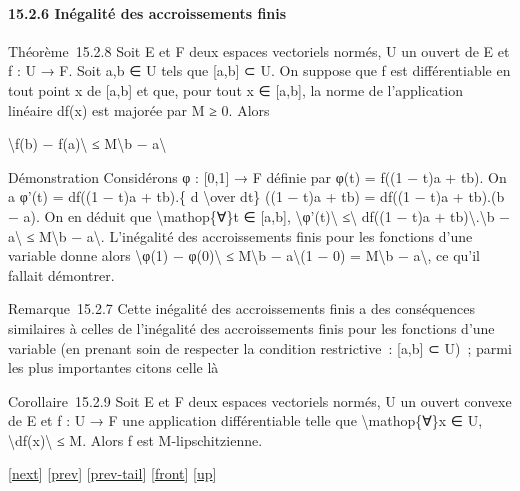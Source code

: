 \documentclass[]{article}
\begin{document}
\paragraph{15.2.6 Inégalité des accroissements finis}

Théorème~15.2.8 Soit E et F deux espaces vectoriels normés, U un ouvert
de E et f : U → F. Soit a,b ∈ U tels que {[}a,b{]} ⊂ U. On suppose que f
est différentiable en tout point x de {[}a,b{]} et que, pour tout x ∈
{[}a,b{]}, la norme de l'application linéaire df(x) est majorée par M ≥
0. Alors

\textbackslash{}\textbar{}f(b) − f(a)\textbackslash{}\textbar{} ≤
M\textbackslash{}\textbar{}b − a\textbackslash{}\textbar{}

Démonstration Considérons φ : {[}0,1{]} → F définie par φ(t) = f((1 −
t)a + tb). On a φ'(t) = df((1 − t)a + tb).\{ d \textbackslash{}over dt\}
((1 − t)a + tb) = df((1 − t)a + tb).(b − a). On en déduit que
\textbackslash{}mathop\{∀\}t ∈ {[}a,b{]},
\textbackslash{}\textbar{}φ'(t)\textbackslash{}\textbar{}
≤\textbackslash{}\textbar{} df((1 − t)a +
tb)\textbackslash{}\textbar{}.\textbackslash{}\textbar{}b −
a\textbackslash{}\textbar{} ≤ M\textbackslash{}\textbar{}b −
a\textbackslash{}\textbar{}. L'inégalité des accroissements finis pour
les fonctions d'une variable donne alors \textbackslash{}\textbar{}φ(1)
− φ(0)\textbackslash{}\textbar{} ≤ M\textbackslash{}\textbar{}b −
a\textbackslash{}\textbar{}(1 − 0) = M\textbackslash{}\textbar{}b −
a\textbackslash{}\textbar{}, ce qu'il fallait démontrer.

Remarque~15.2.7 Cette inégalité des accroissements finis a des
conséquences similaires à celles de l'inégalité des accroissements finis
pour les fonctions d'une variable (en prenant soin de respecter la
condition restrictive~: {[}a,b{]} ⊂ U)~; parmi les plus importantes
citons celle là

Corollaire~15.2.9 Soit E et F deux espaces vectoriels normés, U un
ouvert convexe de E et f : U → F une application différentiable telle
que \textbackslash{}mathop\{∀\}x ∈ U,
\textbackslash{}\textbar{}df(x)\textbackslash{}\textbar{} ≤ M. Alors f
est M-lipschitzienne.

{[}\href{coursse84.html}{next}{]} {[}\href{coursse82.html}{prev}{]}
{[}\href{coursse82.html\#tailcoursse82.html}{prev-tail}{]}
{[}\href{coursse83.html}{front}{]}
{[}\href{coursch16.html\#coursse83.html}{up}{]}
\end{document}
